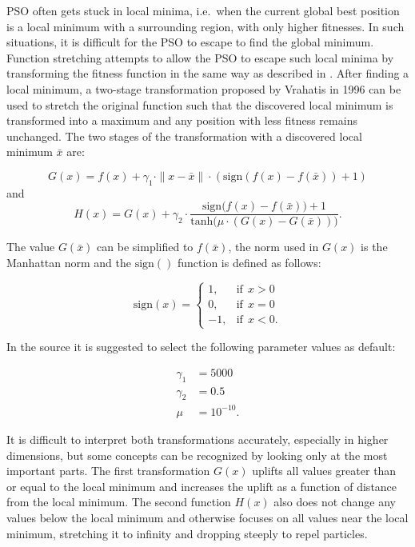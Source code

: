 \documentclass[
  oneside, a4paper, 12pt, openany]{book}
\theoremstyle{definition}
\theoremstyle{definition}
\theoremstyle{definition}
\theoremstyle{definition}
\theoremstyle{remark}
\begin{document}
PSO often gets stuck in local minima, i.e.~when the current global best position is a local minimum with a surrounding region, with only higher fitnesses. In such situations, it is difficult for the PSO to escape to find the global minimum. Function stretching attempts to allow the PSO to escape such local minima by transforming the fitness function in the same way as described in \citep{PaVr2002}. After finding a local minimum, a two-stage transformation proposed by Vrahatis in 1996 can be used to stretch the original function such that the discovered local minimum is transformed into a maximum and any position with less fitness remains unchanged. The two stages of the transformation with a discovered local minimum \(\bar{x}\) are:

\begin{equation} 
G(x) = f(x) +  \gamma_1 \cdot \| x-\bar{x} \| \cdot (\text{sign}(f(x)-f(\bar{x}))+1)
\label{eq:fnstretchG}
\end{equation}
and
\begin{equation} 
  H(x) = G(x) + \gamma_2 \cdot \frac{\text{sign}\biggl(f(x)-f(\bar{x})\biggr)+1}{\text{tanh}\biggl( \mu \cdot (G(x)-G(\bar{x})) \biggr)}.
\label{eq:fnstretchH}
\end{equation}

The value \(G(\bar{x})\) can be simplified to \(f(\bar{x})\), the norm used in \(G(x)\) is the Manhattan norm and the \(\text{sign}()\) function is defined as follows:

\[
  \text{sign}(x) = 
  \begin{cases}
    1, & \text{if}\ \ x > 0\\
    0, & \text{if}\ \ x = 0\\
    -1, & \text{if}\ \ x < 0.
  \end{cases}
\]

In the source it is suggested to select the following parameter values as default:

\begin{align*}
  \gamma_1 &= 5000 \\
  \gamma_2 &= 0.5 \\
  \mu &= 10^{-10}.
\end{align*}

It is difficult to interpret both transformations accurately, especially in higher dimensions, but some concepts can be recognized by looking only at the most important parts. The first transformation \(G(x)\) uplifts all values greater than or equal to the local minimum and increases the uplift as a function of distance from the local minimum. The second function \(H(x)\) also does not change any values below the local minimum and otherwise focuses on all values near the local minimum, stretching it to infinity and dropping steeply to repel particles.
\end{document}
